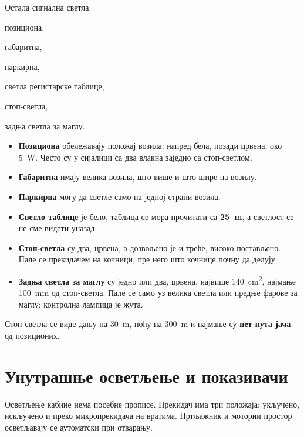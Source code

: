 \documentclass{report}
\begin{document}
\begin{podela}{Остала сигнална светла}
\begin{lista}
    \item позициона,
    \item габаритна,
    \item паркирна,
    \item светла регистарске таблице,
    \item стоп-светла,
    \item задња светла за маглу.
\end{lista}
\end{podela}

\begin{itemize}
    \item \textbf{Позициона} обележавају положај возила: напред бела, позади
          црвена, око 5~W. Често су у сијалици са два влакна заједно са
          стоп-светлом.
    \item \textbf{Габаритна} имају велика возила, што више и што шире на
          возилу.
    \item \textbf{Паркирна} могу да светле само на једној страни возила.
    \item \textbf{Светло таблице} је бело, таблица се мора прочитати са
          \textbf{25~m}, а светлост се не сме видети уназад.
    \item \textbf{Стоп-светла} су два, црвена, а дозвољено је и треће, високо
          постављено. Пале се прекидачем на кочници, пре него што кочнице
          почну да делују.
    \item \textbf{Задња светла за маглу} су једно или два, црвена, највише
          140~cm\textsuperscript{2}, најмање 100~mm од стоп-светла. Пале се
          само уз велика светла или предње фарове за маглу; контролна лампица
          је жута.
\end{itemize}

\begin{kljucno}
Стоп-светла се виде дању на 30~m, ноћу на 300~m и најмање су \textbf{пет пута
јача} од позиционих.
\end{kljucno}

\chapter{Унутрашње осветљење и показивачи}

Осветљење кабине нема посебне прописе. Прекидач има три положаја: укључено,
искључено и преко микропрекидача на вратима. Пртљажник и моторни простор
осветљавају се аутоматски при отварању.
\end{document}
